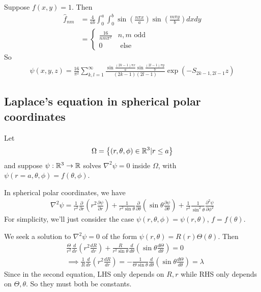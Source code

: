 \documentclass[a4paper]{article}
\begin{document}
\begin{eg}
Suppose $f\left(x,y\right) = 1$. Then
\begin{equation*}
\begin{aligned}
\hat{f}_{nm} &= \frac{4}{ab} \int_0^a \int_0^b \sin\left(\frac{n\pi x}{a}\right) \sin\left(\frac{m\pi y}{b}\right) dxdy\\
&= \left\{
\begin{array}{ll}
\frac{16}{nm\pi^2} & n,m \text{ odd}\\
0 & \text{ else}
\end{array}
\right.
\end{aligned}
\end{equation*}
So
\begin{equation*}
\begin{aligned}
\psi\left(x,y,z\right) = \frac{16}{\pi^2}\sum_{k,l=1}^\infty \frac{\sin\frac{\left(2k-1\right)\pi x}{a} \sin \frac{\left(2l-1\right) \pi y}{b}}{\left(2k-1\right)\left(2l-1\right)} \exp \left(-S_{2k-1,2l-1} z\right)
\end{aligned}
\end{equation*}
\end{eg}

\subsection{Laplace's equation in spherical polar coordinates}
Let $$\Omega = \left\{\left(r,\theta,\phi\right) \in \mathbb{R}^3 | r \leq a\right\}$$ and suppose $\psi:\mathbb{R}^3 \to \mathbb{R}$ solves $\nabla^2 \psi = 0$ inside $\Omega$, with $\psi\left(r=a,\theta,\phi\right) = f\left(\theta,\phi\right)$.

In spherical polar coordinates, we have
\begin{equation*}
\begin{aligned}
\nabla^2 \psi = \frac{1}{r^2} \frac{\partial}{\partial r} \left(r^2 \frac{\partial \psi}{\partial r}\right) + \frac{1}{r^2 \sin \theta} \frac{\partial}{\partial \theta}\left(\sin\theta\frac{\partial \psi}{\partial\theta}\right) + \frac{1}{r^2} \frac{1}{\sin^2 \theta} \frac{\partial^2 \psi}{\partial \phi^2}
\end{aligned}
\end{equation*}
For simplicity, we'll just consider the case $\psi\left(r,\theta,\phi\right) = \psi\left(r,\theta\right)$, $f=f\left(\theta\right)$.

We seek a solution to $\nabla^2 \psi = 0$ of the form $\psi\left(r,\theta\right) = R\left(r\right)\Theta\left(\theta\right)$. Then
\begin{equation*}
\begin{aligned}
&\frac{\Theta}{r^2}\frac{d}{dr}\left(r^2 \frac{dR}{dr}\right) + \frac{R}{r^2 \sin\theta}\frac{d}{d\theta}\left(\sin\theta \frac{d\Theta}{d\theta} \right) = 0\\
&\implies \frac{1}{R}\frac{d}{dr}\left(r^2 \frac{dR}{dr}\right) = -\frac{1}{\Theta\sin\theta}\frac{d}{d\theta} \left(\sin\theta\frac{d\Theta}{d\theta}\right) = \lambda
\end{aligned}
\end{equation*}
Since in the second equation, LHS only depends on $R,r$ while RHS only depends on $\Theta,\theta$. So they must both be constants.
\end{document}
